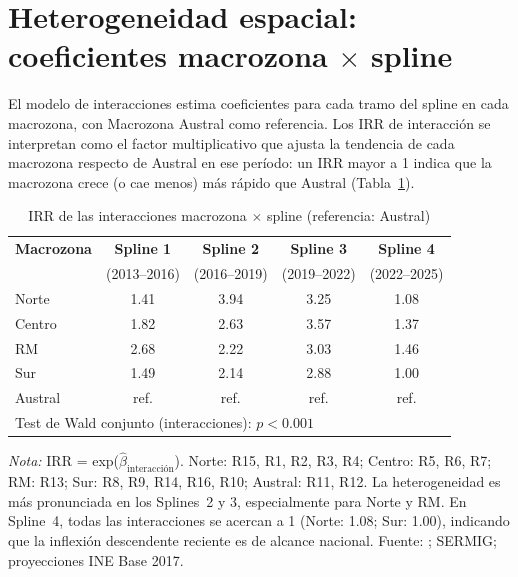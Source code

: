 \documentclass[12pt,a4paper]{article}
\newcommand{\tablenote}[1]{%
  \vspace{2pt}%
  \begin{minipage}{\linewidth}%
    \footnotesize\textit{Nota:} #1%
  \end{minipage}%
}
\begin{document}
\section{Heterogeneidad espacial: coeficientes macrozona $\times$ spline}
\label{ap:macro}

El modelo de interacciones estima coeficientes para cada tramo del spline en cada
macrozona, con Macrozona Austral como referencia. Los IRR de interacci\'on se
interpretan como el factor multiplicativo que ajusta la tendencia de cada macrozona
respecto de Austral en ese per\'iodo: un IRR mayor a 1 indica que la macrozona crece
(o cae menos) m\'as r\'apido que Austral (Tabla~\ref{tab:macro}).

\begin{table}[H]
\centering
\caption{IRR de las interacciones macrozona $\times$ spline (referencia: Austral)}
\label{tab:macro}
\small
\begin{tabular}{lcccc}
\toprule
\textbf{Macrozona} & \textbf{Spline 1} & \textbf{Spline 2} & \textbf{Spline 3} & \textbf{Spline 4} \\
 & (2013--2016) & (2016--2019) & (2019--2022) & (2022--2025) \\
\midrule
Norte   & 1.41 & 3.94 & 3.25 & 1.08 \\
Centro  & 1.82 & 2.63 & 3.57 & 1.37 \\
RM      & 2.68 & 2.22 & 3.03 & 1.46 \\
Sur     & 1.49 & 2.14 & 2.88 & 1.00 \\
Austral & ref. & ref. & ref. & ref. \\
\midrule
\multicolumn{5}{l}{Test de Wald conjunto (interacciones): $p < 0.001$} \\
\bottomrule
\end{tabular}
\tablenote{IRR = exp($\hat{\beta}_{\text{interacci\'on}}$). Norte: R15, R1, R2, R3, R4;
Centro: R5, R6, R7; RM: R13; Sur: R8, R9, R14, R16, R10; Austral: R11, R12. La
heterogeneidad es m\'as pronunciada en los Splines~2 y 3, especialmente para Norte y
RM. En Spline~4, todas las interacciones se acercan a 1 (Norte: 1.08; Sur: 1.00),
indicando que la inflexi\'on descendente reciente es de alcance nacional. Fuente:
\citet{INE2026}; SERMIG; proyecciones INE Base 2017.}
\end{table}

\end{document}
